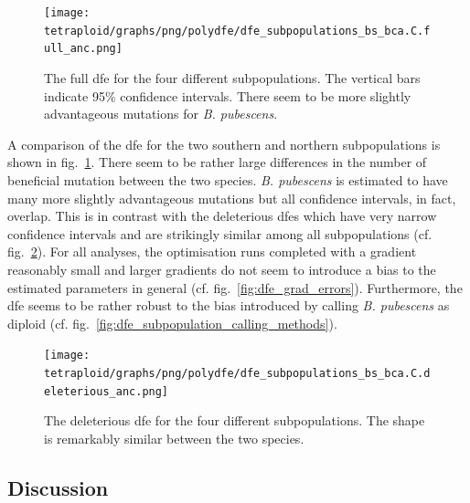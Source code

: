 \documentclass[hidelinks,11pt]{article}
\newcommand{\pubescens}{\textit{B. pubescens}}
\begin{document}
    \begin{figure}[ht]
        \centering
        \texttt{[image: tetraploid/graphs/png/polydfe/dfe\_subpopulations\_bs\_bca.C.full\_anc.png]}
        \caption{The full \acrshort{dfe} for the four different subpopulations. The vertical bars indicate 95\% confidence intervals. There seem to be more slightly advantageous mutations for \pubescens{}.}
        \label{fig:dfe_subpopulations}
    \end{figure}

    A comparison of the \acrshort{dfe} for the two southern and northern subpopulations is shown in fig.~\ref{fig:dfe_subpopulations}. There seem to be rather large differences in the number of beneficial mutation between the two species. \pubescens{} is estimated to have many more slightly advantageous mutations but all confidence intervals, in fact, overlap. This is in contrast with the deleterious \acrshort{dfe}s which have very narrow confidence intervals and are strikingly similar among all subpopulations (cf. fig.~\ref{fig:dfe_subpopulations_deleterious}). For all analyses, the optimisation runs completed with a gradient reasonably small and larger gradients do not seem to introduce a bias to the estimated parameters in general (cf. fig.~\ref{fig:dfe_grad_errors}). Furthermore, the \acrshort{dfe} seems to be rather robust to the bias introduced by calling \pubescens{} as diploid (cf. fig.~\ref{fig:dfe_subpopulation_calling_methods}).

    \begin{figure}[ht]
        \centering
        \texttt{[image: tetraploid/graphs/png/polydfe/dfe\_subpopulations\_bs\_bca.C.deleterious\_anc.png]}
        \caption{The deleterious \acrshort{dfe} for the four different subpopulations. The shape is remarkably similar between the two species.}
        \label{fig:dfe_subpopulations_deleterious}
    \end{figure}

    \subsection{Discussion}
\end{document}
